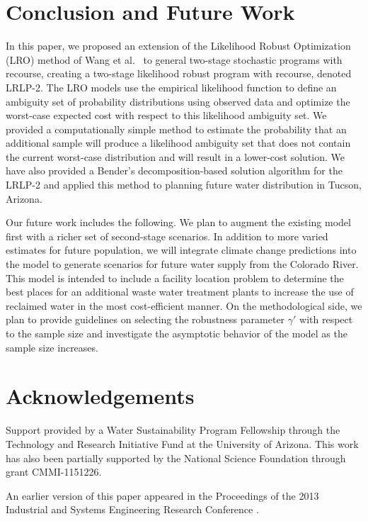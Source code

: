 \documentclass[11pt]{article}
\begin{document}
\section{Conclusion and Future Work}
\label{sec:concl}

In this paper, we proposed an extension of the Likelihood Robust Optimization (LRO) method of Wang et al.\ \cite{wang2010likelihood} to general two-stage stochastic programs with recourse, creating a two-stage likelihood robust program with recourse, denoted LRLP-2.
The LRO models use the empirical likelihood function to define an ambiguity set of probability distributions using observed data and optimize the worst-case expected cost with respect to this likelihood ambiguity set.
We provided a computationally simple method to estimate the probability that an additional sample will produce a likelihood ambiguity set that does not contain the current worst-case distribution and will result in a lower-cost solution. 
We have also provided a Bender's decomposition-based solution algorithm for the LRLP-2 and applied this method to planning future water distribution in Tucson, Arizona.

Our future work includes the following. We plan to augment the existing model first with a richer set of second-stage scenarios.
In addition to more varied estimates for future population, we will integrate climate change predictions into the model to generate scenarios for future water supply from the Colorado River. 
This model is intended to include a facility location problem to determine the best places for an additional waste water treatment plants to increase the use of reclaimed water in the most cost-efficient manner. On the methodological side, we plan to provide guidelines on selecting the robustness parameter $\gamma'$ with respect to the sample size and investigate the asymptotic behavior of the model as the sample size increases. 

\section*{Acknowledgements}
Support provided by a Water Sustainability Program Fellowship through the Technology and Research Initiative Fund at the University of Arizona.
This work has also been partially supported by the National Science Foundation through grant CMMI-1151226.

An earlier version of this paper appeared in the Proceedings of the 2013 Industrial and Systems Engineering Research Conference \cite{love2013likelihood}.


\end{document}
